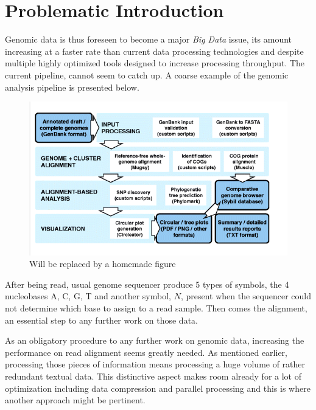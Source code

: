 \section{Problematic Introduction}

Genomic data is thus foreseen to become a major \textit{Big Data} issue, its amount increasing at a faster rate than current data processing technologies and despite multiple highly optimized tools designed to increase processing throughput. The current pipeline, cannot seem to catch up. A coarse example of the genomic analysis pipeline is presented below. \\

\begin{minipage}[t]{0.60\textwidth}
\begin{figure}[H]
    \centering
    \includegraphics[scale = 0.4]{Figures/pipeline.png}
    \caption{Will be replaced by a homemade figure}
    \label{fig:analysispipe}
\end{figure}
\end{minipage}
\begin{minipage}[t]{0.350\textwidth}
After being read, usual genome sequencer produce 5 types of symbols, the 4 nucleobases A, C, G, T and another symbol, $N$, present when the sequencer could not determine which base to assign to a read sample. Then comes the alignment, an essential step to any further work on those data. \\

\end{minipage}
\vspace*{5mm}



As an obligatory procedure to any further work on genomic data, increasing the performance on read alignment seems greatly needed. As mentioned earlier, processing those pieces of information means processing a huge volume of rather redundant textual data. This distinctive aspect makes room already for a lot of optimization including data compression and parallel processing and this is where another approach might be pertinent. \\

